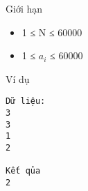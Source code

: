 Giới hạn  
\begin{itemize}
	\item     1 ≤ N ≤ 60000   
	\item     1 ≤ $a_{i}$    ≤ 60000   
\end{itemize}
   Ví dụ  
\begin{verbatim}
Dữ liệu:
3
3
1
2

Kết qủa
2
\end{verbatim}